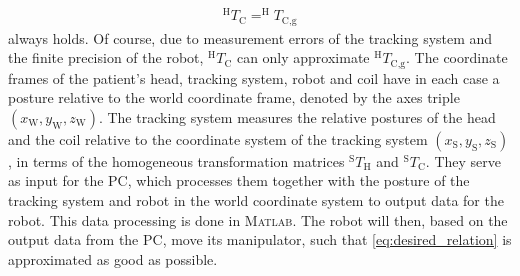 \begin{align}
^{\text{H}}T_{\text{C}} = ^{\text{H}}T_{\text{C,g}}
\label{eq:desired_relation}
\end{align}
always holds. Of course, due to measurement errors of the tracking system and the finite precision of the robot, $^{\text{H}}T_{\text{C}}$ can only approximate $^{\text{H}}T_{\text{C,g}}$. The coordinate frames of the patient's head, tracking system, robot and coil
have in each case a posture relative to the world coordinate frame, denoted by the axes triple
$\left( x_{\text{W}},y_{\text{W}},z_{\text{W}} \right)$. The tracking system measures the relative postures of the head and the coil relative to the coordinate system of the tracking system $\left( x_{\text{S}},y_{\text{S}},z_{\text{S}} \right)$, in terms of the homogeneous transformation matrices $^{\text{S}}T_{\text{H}}$ and $^{\text{S}}T_{\text{C}}$. They serve as input for the PC, which processes them together with the posture of the tracking system and robot in the world coordinate system to output data for the robot. This data processing is done in \textsc{Matlab}. The robot will then, based on the output data from the PC, move its manipulator, such that \eqref{eq:desired_relation} is approximated as good as possible.
